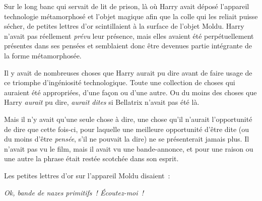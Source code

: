 Sur le long banc qui servait de lit de prison, là où Harry avait déposé l'appareil technologie métamorphosé et l'objet magique afin que la colle qui les reliait puisse sécher, de petites lettres d'or scintillaient à la surface de l'objet Moldu. Harry n'avait pas réellement \emph{prévu} leur présence, mais elles avaient été perpétuellement présentes dans ses pensées et semblaient donc être devenues partie intégrante de la forme métamorphosée.

Il y avait de nombreuses choses que Harry aurait pu dire avant de faire usage de ce triomphe d'ingéniosité technologique. Toute une collection de choses qui auraient été appropriées, d'une façon ou d'une autre. Ou du moins des choses que Harry \emph{aurait} pu dire, \emph{aurait dites} si Bellatrix n'avait pas été là.

Mais il n'y avait qu'une seule chose à dire, une chose qu'il n'aurait l'opportunité de dire que cette fois-ci, pour laquelle une meilleure opportunité d'être dite (ou du moins d'être \emph{pensée}, s'il ne pouvait la dire) ne se présenterait jamais plus. Il n'avait pas vu le film, mais il avait vu une bande-annonce, et pour une raison ou une autre la phrase était restée scotchée dans son esprit.

Les petites lettres d'or sur l'appareil Moldu disaient~:

\emph{Ok, bande de nazes primitifs~! Écoutez-moi~!}

